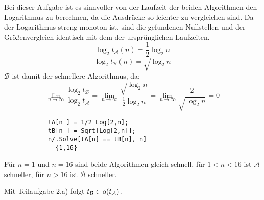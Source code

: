 \begin{flushenum}
\item 
	\begin{flushalpha}
	\item
		Bei dieser Aufgabe ist es sinnvoller von der Laufzeit der beiden Algorithmen den Logarithmus zu berechnen,
		da die Ausdrücke so leichter zu vergleichen sind. Da der Logarithmus streng monoton ist,
		sind die gefundenen Nullstellen und der Größenvergleich identisch mit dem der ursprünglichen Laufzeiten.
		\[ \log_2 t_\mathcal{A}(n) = \frac{1}{2} \log_2 n \]
		\[ \log_2 t_\mathcal{B}(n) = \sqrt{\log_2 n} \]
		$\mathcal{B}$ ist damit der schnellere Algorithmus, da:
		\[ \lim_{n \rightarrow \infty} \frac{\log_2 t_\mathcal{B}}{\log_2 t_\mathcal{A}} = 
		   \lim_{n \rightarrow \infty} \frac{\sqrt{\log_2 n}}{\frac{1}{2} \log_2 n} =
		   \lim_{n \rightarrow \infty} \frac{2}{\sqrt{\log_2 n}} = 0 \]
	\item
		\begin{lstlisting}
			tA[n_] = 1/2 Log[2,n];
			tB[n_] = Sqrt[Log[2,n]];
			n/.Solve[tA[n] == tB[n], n]
			  {1,16}
		\end{lstlisting}
		Für $n=1$ und $n=16$ sind beide Algorithmen gleich schnell, für $1 < n < 16$ ist $\mathcal{A}$ schneller,
		für $n > 16$ ist $\mathcal{B}$ schneller.
	
	\item
		Mit Teilaufgabe 2.a) folgt $t_\mathcal{B} \in \hbox{o}(t_\mathcal{A})$.
	\end{flushalpha}
\end{flushenum}
